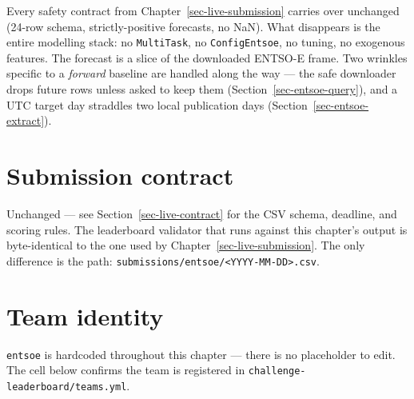 \documentclass[
  english,
  letterpaper,
]{scrbook}
\begin{document}
Every safety contract from Chapter~\ref{sec-live-submission} carries
over unchanged (24-row schema, strictly-positive forecasts, no NaN).
What disappears is the entire modelling stack: no \texttt{MultiTask}, no
\texttt{ConfigEntsoe}, no tuning, no exogenous features. The forecast is
a slice of the downloaded ENTSO-E frame. Two wrinkles specific to a
\emph{forward} baseline are handled along the way --- the safe
downloader drops future rows unless asked to keep them
(Section~\ref{sec-entsoe-query}), and a UTC target day straddles two
local publication days (Section~\ref{sec-entsoe-extract}).

\section{Submission contract}\label{submission-contract-1}

Unchanged --- see Section~\ref{sec-live-contract} for the CSV schema,
deadline, and scoring rules. The leaderboard validator that runs against
this chapter's output is byte-identical to the one used by
Chapter~\ref{sec-live-submission}. The only difference is the path:
\texttt{submissions/entsoe/\textless{}YYYY-MM-DD\textgreater{}.csv}.

\section{Team identity}\label{sec-entsoe-identity}

\texttt{entsoe} is hardcoded throughout this chapter --- there is no
placeholder to edit. The cell below confirms the team is registered in
\texttt{challenge-leaderboard/teams.yml}.
\end{document}
